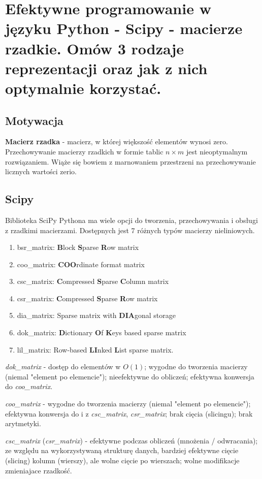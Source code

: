 \section{Efektywne programowanie w języku Python - Scipy - macierze rzadkie.
Omów 3 rodzaje reprezentacji oraz jak z nich optymalnie korzystać.}

\subsection{Motywacja}

\textbf{Macierz rzadka} - macierz, w której większość elementów wynosi zero.
Przechowywanie macierzy rzadkich w formie tablic $n\times m$ jest nieoptymalnym rozwiązaniem.
Wiąże się bowiem z marnowaniem przestrzeni na przechowywanie licznych wartości zerio.

\subsection{Scipy}

Biblioteka SciPy Pythona ma wiele opcji do tworzenia, przechowywania i obsługi z rzadkimi macierzami.
Dostępnych jest 7 różnych typów macierzy nieliniowych.

\begin{enumerate}[itemsep=0pt,partopsep=0pt, parsep=0pt]
    \item bsr\_matrix: \textbf{B}lock \textbf{S}parse \textbf{R}ow matrix
    \item coo\_matrix: \textbf{COO}rdinate format matrix
    \item csc\_matrix: \textbf{C}ompressed \textbf{S}parse \textbf{C}olumn matrix
    \item csr\_matrix: \textbf{C}ompressed \textbf{S}parse \textbf{R}ow matrix
    \item dia\_matrix: Sparse matrix with \textbf{DIA}gonal storage
    \item dok\_matrix: \textbf{D}ictionary \textbf{O}f \textbf{K}eys based sparse matrix
    \item lil\_matrix: Row-based \textbf{LI}nked \textbf{L}ist sparse matrix.
\end{enumerate}

\textit{dok\_matrix} - dostęp do elementów w $O(1)$; wygodne do tworzenia macierzy (niemal "element po elemencie");
nieefektywne do obliczeń; efektywna konwersja do \textit{coo\_matrix}.


\textit{coo\_matrix} - wygodne do tworzenia macierzy (niemal "element po elemencie");
efektywna konwersja do i z \textit{csc\_matrix}, \textit{csr\_matrix}; brak cięcia (slicingu); brak arytmetyki.


\textit{csc\_matrix} (\textit{csr\_matrix}) - efektywne podczas obliczeń (mnożenia / odwracania);
ze względu na wykorzystywaną strukturę danych, bardziej efektywne cięcie (slicing) kolumn (wierszy),
ale wolne cięcie po wierszach; wolne modifikacje zmieniajace rzadkość.

